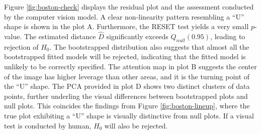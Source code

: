 \documentclass[]{interact}
\theoremstyle{plain}%
\theoremstyle{definition}
\theoremstyle{remark}
\begin{document}
Figure \ref{fig:boston-check} displays the residual plot and the
assessment conducted by the computer vision model. A clear non-linearity
pattern resembling a ``U'' shape is shown in the plot A. Furthermore,
the RESET test yields a very small \(p\)-value. The estimated distance
\(\hat{D}\) significantly exceeds \(Q_{null}(0.95)\), leading to
rejection of \(H_0\). The bootstrapped distribution also suggests that
almost all the bootstrapped fitted models will be rejected, indicating
that the fitted model is unlikely to be correctly specified. The
attention map in plot B suggests the center of the image has higher
leverage than other areas, and it is the turning point of the ``U''
shape. The PCA provided in plot D shows two distinct clusters of data
points, further underling the visual differences between bootstrapped
plots and null plots. This coincides the findings from Figure
\ref{fig:boston-lineup}, where the true plot exhibiting a ``U'' shape is
visually distinctive from null plots. If a visual test is conducted by
human, \(H_0\) will also be rejected.
\end{document}
